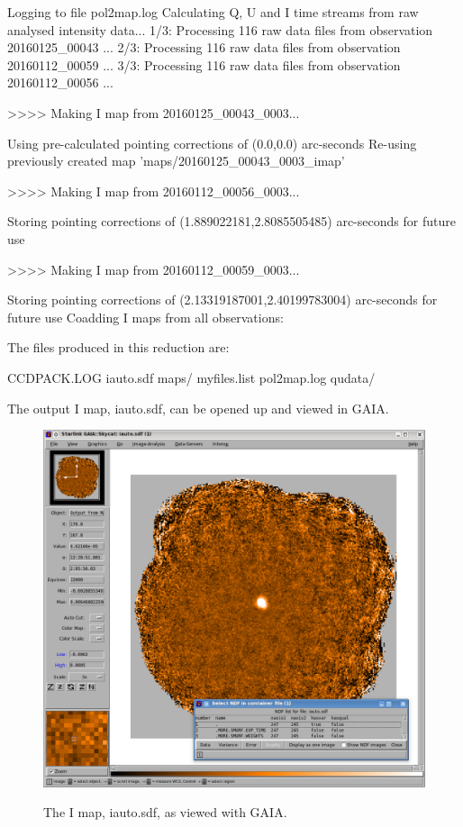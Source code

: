 \begin{terminalv}
Logging to file pol2map.log
Calculating Q, U and I time streams from raw analysed intensity data...
   1/3: Processing 116 raw data files from observation 20160125_00043 ...
   2/3: Processing 116 raw data files from observation 20160112_00059 ...
   3/3: Processing 116 raw data files from observation 20160112_00056 ...

>>>>   Making I map from 20160125_00043_0003...

   Using pre-calculated pointing corrections of (0.0,0.0) arc-seconds
   Re-using previously created map 'maps/20160125_00043_0003_imap'

>>>>   Making I map from 20160112_00056_0003...

Storing pointing corrections of (1.889022181,2.8085505485) arc-seconds for future use

>>>>   Making I map from 20160112_00059_0003...

Storing pointing corrections of (2.13319187001,2.40199783004) arc-seconds for future use
Coadding I maps from all observations:
\end{terminalv}

The files produced in this reduction are:


\begin{terminalv}
CCDPACK.LOG  iauto.sdf  maps/  myfiles.list  pol2map.log  qudata/
\end{terminalv}

The output I map, iauto.sdf, can be opened up and viewed in GAIA.

\begin{figure}[t!]
\begin{center}
\includegraphics[width=0.8\linewidth]{sc22-gaia-view-iauto.png}
\label{fig:gaia-iauto}
\caption [I map in GAIA]{
  \small The I map, iauto.sdf, as viewed with GAIA. 
}
\end{center}
\end{figure}

